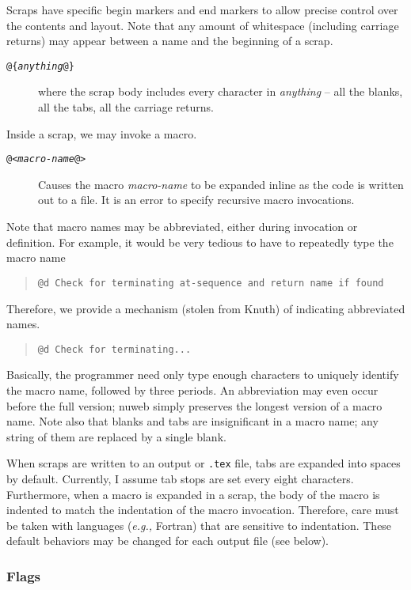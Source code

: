 Scraps have specific begin markers and end markers to allow precise
control over the contents and layout. Note that any amount of
whitespace (including carriage returns) may appear between a name and
the beginning of a scrap.
\begin{description}
\item[\tt @\{{\em anything\/}@\}] where the scrap body includes every
  character in {\em anything\/} -- all the blanks, all the tabs, all the
  carriage returns.
\end{description}
Inside a scrap, we may invoke a macro.
\begin{description}
\item[\tt @<{\em macro-name\/}@>] Causes the macro 
  {\em macro-name\/} to be expanded inline as the code is written out
  to a file. It is an error to specify recursive macro invocations.
\end{description}
Note that macro names may be abbreviated, either during invocation or
definition. For example, it would be very tedious to have to
repeatedly type the macro name
\begin{quote}
\verb|@d Check for terminating at-sequence and return name if found|
\end{quote}
Therefore, we provide a mechanism (stolen from Knuth) of indicating
abbreviated names.
\begin{quote}
\verb|@d Check for terminating...|
\end{quote}
Basically, the programmer need only type enough characters to uniquely
identify the macro name, followed by three periods. An abbreviation
may even occur before the full version; nuweb simply preserves the
longest version of a macro name. Note also that blanks and tabs are
insignificant in a macro name; any string of them are replaced by a
single blank.

When scraps are written to an output or \verb|.tex| file, tabs are
expanded into spaces by default. Currently, I assume tab stops are set
every eight characters. Furthermore, when a macro is expanded in a scrap,
the body of the macro is indented to match the indentation of the
macro invocation. Therefore, care must be taken with languages 
({\em e.g.,} Fortran) that are sensitive to indentation.
These default behaviors may be changed for each output file (see
below).

\subsubsection{Flags}

